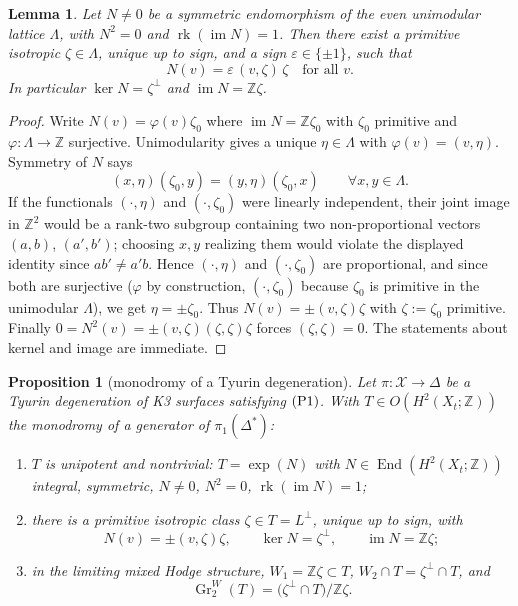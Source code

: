 \documentclass[11pt]{amsart}
\theoremstyle{plain}
\newtheorem{lemma}[theorem]{Lemma}
\newtheorem{proposition}[theorem]{Proposition}
\theoremstyle{definition}
\theoremstyle{remark}
\numberwithin{equation}{section}
\begin{document}
\begin{lemma}\label{L:rank-one}
Let \(N\neq0\) be a symmetric endomorphism of the even unimodular lattice
\(\Lambda\), with \(N^{2}=0\) and \(\operatorname{rk}(\operatorname{im}N)=1\).
Then there exist a primitive isotropic \(\zeta\in\Lambda\), unique up to sign,
and a sign \(\varepsilon\in\{\pm1\}\), such that
\[
N(v)=\varepsilon\,(v,\zeta)\,\zeta\quad\text{for all }v.
\]
In particular \(\ker N=\zeta^{\perp}\) and \(\operatorname{im}N=\mathbb Z\zeta\).
\end{lemma}

\begin{proof}
Write \(N(v)=\varphi(v)\zeta_{0}\) where
\(\operatorname{im}N=\mathbb Z\zeta_{0}\) with \(\zeta_{0}\) primitive and
\(\varphi\colon\Lambda\to\mathbb Z\) surjective. Unimodularity gives a unique
\(\eta\in\Lambda\) with \(\varphi(v)=(v,\eta)\). Symmetry of \(N\) says
\[
(x,\eta)(\zeta_{0},y)=(y,\eta)(\zeta_{0},x)\qquad\forall x,y\in\Lambda .
\]
If the functionals \((\cdot,\eta)\) and \((\cdot,\zeta_{0})\) were linearly
independent, their joint image in \(\mathbb Z^{2}\) would be a rank-two
subgroup containing two non-proportional vectors \((a,b)\), \((a',b')\);
choosing \(x,y\) realizing them would violate the displayed identity since
\(ab'\neq a'b\). Hence \((\cdot,\eta)\) and \((\cdot,\zeta_{0})\) are
proportional, and since both are surjective (\(\varphi\) by construction,
\((\cdot,\zeta_{0})\) because \(\zeta_{0}\) is primitive in the unimodular
\(\Lambda\)), we get \(\eta=\pm\zeta_{0}\). Thus
\(N(v)=\pm(v,\zeta)\zeta\) with \(\zeta:=\zeta_{0}\) primitive. Finally
\(0=N^{2}(v)=\pm(v,\zeta)(\zeta,\zeta)\zeta\) forces
\((\zeta,\zeta)=0\). The statements about kernel and image are immediate.
\end{proof}

\begin{proposition}[monodromy of a Tyurin degeneration]\label{P:monodromy}
Let \(\pi\colon\mathcal X\to\Delta\) be a Tyurin degeneration of K3 surfaces
satisfying \(\textup{(P1)}\). With \(T\in O(H^{2}(X_{t};\mathbb Z))\) the
monodromy of a generator of \(\pi_{1}(\Delta^{*})\):
\begin{enumerate}
\item \(T\) is unipotent and nontrivial: \(T=\exp(N)\) with
\(N\in\operatorname{End}(H^{2}(X_{t};\mathbb Z))\) integral, symmetric,
\(N\neq0\), \(N^{2}=0\), \(\operatorname{rk}(\operatorname{im}N)=1\);
\item there is a primitive isotropic class
\(\zeta\in T=L^{\perp}\), unique up to sign, with
\[
N(v)=\pm(v,\zeta)\zeta,\qquad \ker N=\zeta^{\perp},\qquad
\operatorname{im}N=\mathbb Z\zeta;
\]
\item in the limiting mixed Hodge structure, \(W_{1}=\mathbb Z\zeta\subset T\),
\(W_{2}\cap T=\zeta^{\perp}\cap T\), and
\[
\operatorname{Gr}^{W}_{2}(T)=\bigl(\zeta^{\perp}\cap T\bigr)/\mathbb Z\zeta .
\]
\end{enumerate}
\end{proposition}
\end{document}
